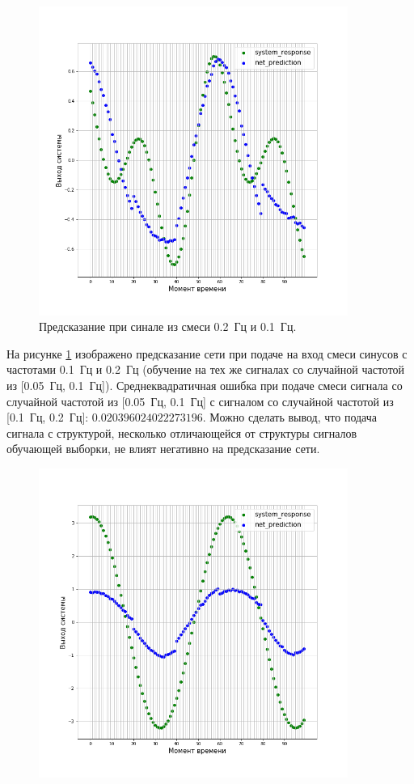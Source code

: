\documentclass[12pt, oneside]{extbook}
\begin{document}
\begin{flushleft}
\par
\begin{figure}[h]
\centering
\includegraphics[width=0.9\textwidth]{rnn_prediction_mix}
\caption{Предсказание при синале из смеси 0.2~Гц и 0.1~Гц.}
\label{fig:lstm_prediction_mix}
\end{figure}
На рисунке \ref{fig:lstm_prediction_mix} изображено предсказание сети при подаче на вход смеси синусов с частотами 0.1~Гц и 0.2~Гц (обучение на тех же сигналах со случайной частотой из [0.05~Гц, 0.1~Гц]). Среднеквадратичная ошибка при подаче смеси сигнала со случайной частотой из [0.05~Гц, 0.1~Гц] с сигналом со случайной частотой из [0.1~Гц, 0.2~Гц]: $0.020396024022273196$. Можно сделать вывод, что подача сигнала с структурой, несколько отличающейся от структуры сигналов обучающей выборки, не влият негативно на предсказание сети.
\par
\begin{figure}[h]
\centering
\includegraphics[width=0.9\textwidth]{rnn_prediction_high_magnitude}

\end{figure}
\end{flushleft}
\end{document}

